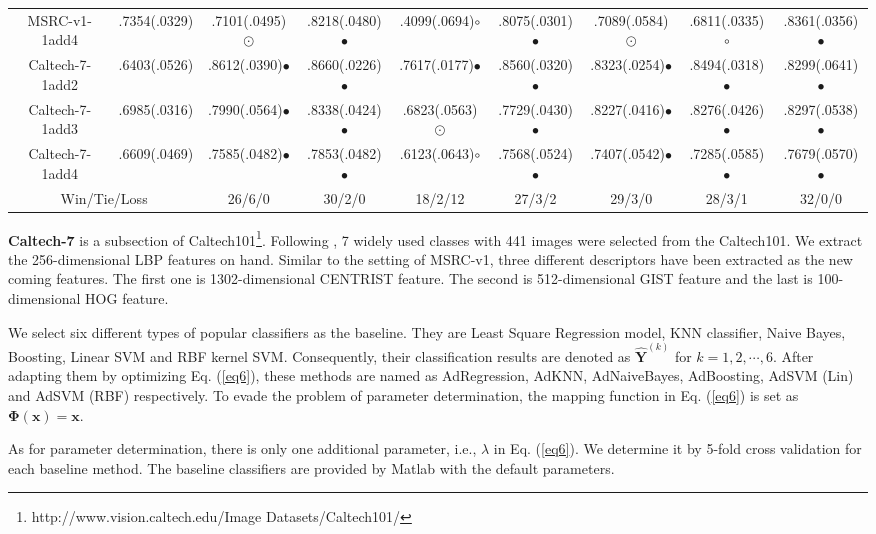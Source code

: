 \documentclass[10pt,journal,compsoc]{IEEEtran}
\begin{document}
\begin{table*}[!t]
{\begin{tabular}{c|| c c c c c c c c }
MSRC-v1-1add4   & .7354(.0329) & .7101(.0495){\tiny $\odot$} & .8218(.0480)$\bullet$ & .4099(.0694)$\circ$ & .8075(.0301)$\bullet$ & .7089(.0584){\tiny $\odot$} & .6811(.0335)$\circ$ & .8361(.0356)$\bullet$ \\
Caltech-7-1add2 & .6403(.0526) & .8612(.0390)$\bullet$  & .8660(.0226)$\bullet$  & .7617(.0177)$\bullet$  & .8560(.0320)$\bullet$  & .8323(.0254)$\bullet$  & .8494(.0318)$\bullet$  & .8299(.0641)$\bullet$  \\
Caltech-7-1add3 & .6985(.0316) & .7990(.0564)$\bullet$ & .8338(.0424)$\bullet$ & .6823(.0563){\tiny $\odot$} & .7729(.0430)$\bullet$ & .8227(.0416)$\bullet$ & .8276(.0426)$\bullet$ & .8297(.0538)$\bullet$\\
Caltech-7-1add4 & .6609(.0469) & .7585(.0482)$\bullet$ & .7853(.0482)$\bullet$ & .6123(.0643)$\circ$ & .7568(.0524)$\bullet$ & .7407(.0542)$\bullet$ & .7285(.0585)$\bullet$ & .7679(.0570)$\bullet$ \\
\hline
\multicolumn{2}{c}{Win/Tie/Loss}& 26/6/0 & 30/2/0 & 18/2/12 & 27/3/2 & 29/3/0 & 28/3/1 & 32/0/0  \\
\hline
\end{tabular}}
\vskip -0.1in
\end{table*}

\textbf{Caltech-7} is a subsection of Caltech101\footnote{http://www.vision.caltech.edu/Image Datasets/Caltech101/}. Following \cite{iccv/DueckF07}, 7 widely used classes with 441 images were selected from the Caltech101. We extract the 256-dimensional LBP features on hand. Similar to the setting of MSRC-v1, three different descriptors have been extracted as the new coming features. The first one is 1302-dimensional CENTRIST feature. The second is 512-dimensional GIST feature and the last is 100-dimensional HOG feature.

We select six different types of popular classifiers as the baseline. They are Least Square Regression model, KNN classifier, Naive Bayes, Boosting, Linear SVM and RBF kernel SVM. Consequently, their classification results are denoted as $\hat{\mathbf{Y}}^{(k)}$ for $k=1,2,\cdots,6$. After adapting them by optimizing Eq. (\ref{eq6}), these methods are named as AdRegression, AdKNN, AdNaiveBayes, AdBoosting, AdSVM (Lin) and AdSVM (RBF) respectively. To evade the problem of parameter determination, the mapping function in Eq. (\ref{eq6}) is set as $\mathbf{\Phi(\mathbf{x})}=\mathbf{x}$.

As for parameter determination, there is only one additional parameter, i.e., $\lambda$ in Eq. (\ref{eq6}). We determine it by 5-fold cross validation for each baseline method. The baseline classifiers are provided by Matlab with the default parameters.
\end{document}
